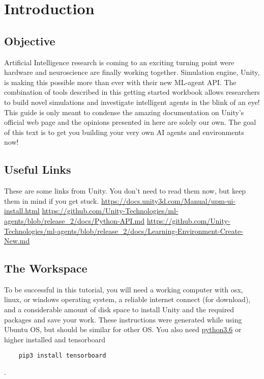 \documentclass[11pt,fleqn,openany]{book} %
\begin{document}

\pagestyle{fancy} %



\chapter{Introduction}

\section{Objective}
Artificial Intelligence research is coming to an exciting turning point were hardware and neuroscience are finally working together. Simulation engine, Unity, is making this possible more than ever with their new ML-agent API. The combination of tools described in this getting started workbook allows researchers to build novel simulations and investigate intelligent agents in the blink of an eye! This guide is only meant to condense the amazing documentation on Unity's official web page and the opinions presented in here are solely our own. The goal of this text is to get you building your very own AI agents and environments now!

\section{Useful Links}
These are some links from Unity. You don't need to read them now, but keep them in mind if you get stuck.
\href{Unity Manual}{https://docs.unity3d.com/Manual/upm-ui-install.html}
\href{ML-agents API Docs}{https://github.com/Unity-Technologies/ml-agents/blob/release_2/docs/Python-API.md}
\href{Basic Unity Tutorial}{https://github.com/Unity-Technologies/ml-agents/blob/release_2/docs/Learning-Environment-Create-New.md}

\section{The Workspace}
To be successful in this tutorial, you will need a working computer with osx, linux, or windows operating system, a reliable internet connect (for download), and a considerable amount of disk space to install Unity and the required packages and save your work. These instructions were generated while using Ubuntu OS, but should be similar for other OS. You also need \href{https://www.python.org/downloads/}{python3.6} or higher installed and tensorboard \begin{verbatim}
    pip3 install tensorboard
\end{verbatim}.
\end{document}
